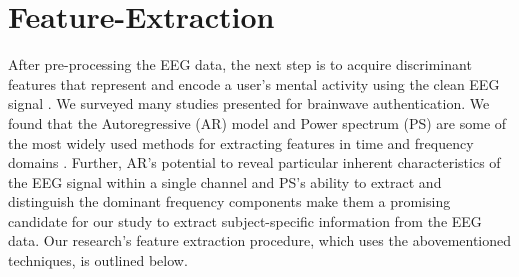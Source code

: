 \section{\large Feature-Extraction}
\label{sec:Framework:Feature-Extraction}
After pre-processing the EEG data, the next step is to acquire discriminant features that represent and encode a user's mental activity using the clean EEG signal \cite{survey_brain_biometrics}. We surveyed many studies presented for brainwave authentication. We found
that the Autoregressive (AR) model and Power spectrum (PS) are some of the most widely used methods for extracting features in time and frequency domains \cite{arias2023performance, arias2021inexpensive}. Further, AR's potential to reveal particular inherent characteristics of the EEG signal within a single channel and PS's ability to extract and distinguish the dominant frequency components \cite{survey_brain_biometrics} make them a promising candidate for our study to extract subject-specific information from the EEG data. Our research's feature extraction procedure, which uses the abovementioned techniques, is outlined below.  

